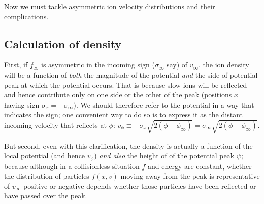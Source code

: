 \documentclass[pre]{revtex4-2}
\begin{document}
Now we must tackle asymmetric ion velocity distributions and their
complications.

\subsection{Calculation of density}

First, if $f_\infty$ is asymmetric in the incoming sign ($\sigma_\infty$ say)
of $v_\infty$, the ion density will be a function of \emph{both} the
magnitude of the potential \emph{and} the side of potential peak at
which the potential occurs. That is because slow ions will be
reflected and hence contribute only on one side or the other of the
peak (positions $x$ having sign $\sigma_x=-\sigma_\infty$). We should
therefore refer to the potential in a way that indicates the sign; one
convenient way to do so is to express it as the distant incoming
velocity that reflects at $\phi$:
$v_\phi\equiv-\sigma_x\sqrt{2(\phi-\phi_\infty)}=\sigma_\infty\sqrt{2(\phi-\phi_\infty)}$.

But second, even with this clarification, the density is actually a
function of the local potential (and hence $v_\phi$) \emph{and also} the
height of of the potential peak $\psi$; because although in a
collisionless situation $f$ and energy are constant, whether the
distribution of particles $f(x,v)$ moving away from the peak is
representative of $v_\infty$ positive or negative depends whether
those particles have been reflected or have passed over the peak.
\end{document}
